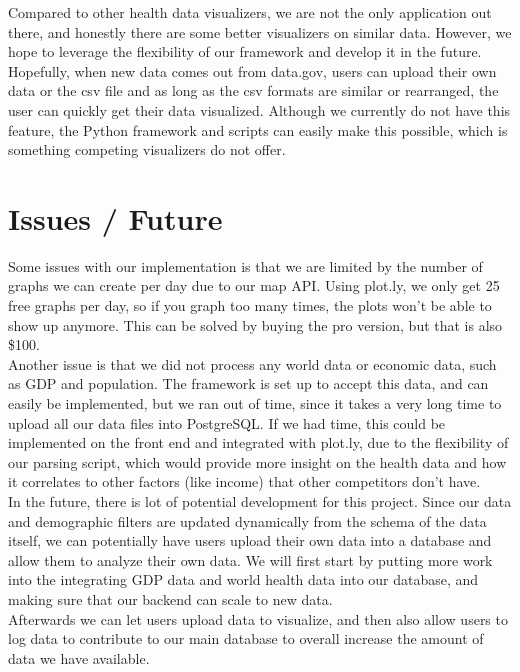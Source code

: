\documentclass[12pt]{article}
\begin{document}
Compared to other health data visualizers, we are not the only application out there, and honestly there are some better visualizers on similar data. However, we hope to leverage the flexibility of our framework and develop it in the future. Hopefully, when new data comes out from data.gov, users can upload their own data or the csv file and as long as the csv formats are similar or rearranged, the user can quickly get their data visualized. Although we currently do not have this feature, the Python framework and scripts can easily make this possible, which is something competing visualizers do not offer. \\
\section{Issues / Future}
Some issues with our implementation is that we are limited by the number of graphs we can create per day due to our map API. Using plot.ly, we only get 25 free graphs per day, so if you graph too many times, the plots won't be able to show up anymore. This can be solved by buying the pro version, but that is also \$100.\\

Another issue is that we did not process any world data or economic data, such as GDP and population. The framework is set up to accept this data, and can easily be implemented, but we ran out of time, since it takes a very long time to upload all our data files into PostgreSQL. If we had time, this could be implemented on the front end and integrated with plot.ly, due to the flexibility of our parsing script, which would provide more insight on the health data and how it correlates to other factors (like income) that other competitors don't have.\\

In the future, there is lot of potential development for this project. Since our data and demographic filters are updated dynamically from the schema of the data itself, we can potentially have users upload their own data into a database and allow them to analyze their own data. We will first start by putting more work into the integrating GDP data and world health data into our database, and making sure that our backend can scale to new data.\\

Afterwards we can let users upload data to visualize, and then also allow users to log data to contribute to our main database to overall increase the amount of data we have available.
\end{document}
